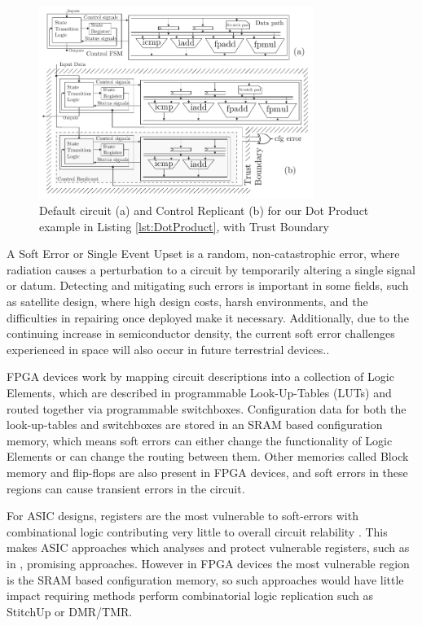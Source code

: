 \begin{figure}[t]
\centering
\includegraphics[width=3.5in]{./imgs/StitchUpReplication.pdf}
\caption{Default circuit (a) and Control Replicant (b) for our Dot Product example in Listing \ref{lst:DotProduct}, with Trust Boundary \vspace{-5mm}}
\label{fig:HLSArch}
\end{figure}

A Soft Error or Single Event Upset is a random, non-catastrophic error, where radiation causes
a perturbation to a circuit by temporarily altering a single signal or datum.
Detecting and mitigating such errors is important in some fields, such as satellite design,
where high design costs, harsh environments, and the difficulties in repairing once deployed make it necessary.
Additionally, due to the continuing increase in semiconductor density, the current soft error challenges 
experienced in space will also occur in future terrestrial devices.\cite{normand1996single}\cite{henkel2013reliable}.

FPGA devices work by mapping circuit descriptions into a collection of Logic Elements,
which are described in programmable Look-Up-Tables (LUTs) and routed together via
programmable switchboxes.
Configuration data for both the look-up-tables and switchboxes are stored in an SRAM based
configuration memory, which means soft errors can either change the functionality
of Logic Elements or can change the routing between them.
Other memories called Block memory and flip-flops are also present in FPGA devices,
and soft errors in these regions can cause transient errors in the circuit.

For ASIC designs, registers are the most vulnerable to soft-errors with
combinational logic contributing very little to overall circuit relability \cite{baumann2005soft}.
This makes ASIC approaches which analyses and protect vulnerable registers, such as in \cite{chen2014reliability},
promising approaches.
However in FPGA devices the most vulnerable region is the SRAM based configuration memory,
so such approaches would have little impact requiring methods perform combinatorial logic
replication such as StitchUp or DMR/TMR.

